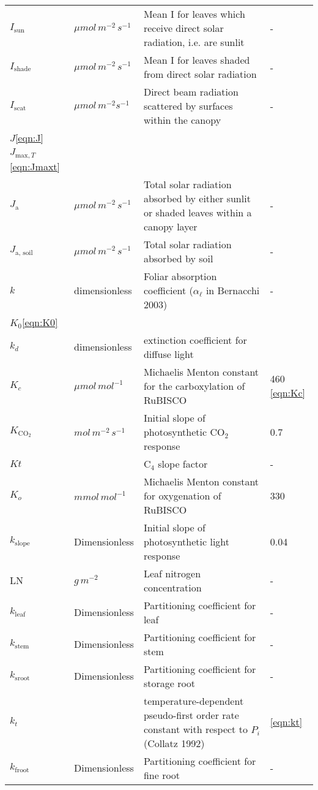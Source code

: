 \documentclass[10pt]{article}
\renewcommand{\marginnote}[2][]{}
\begin{document}
\begin{center}
\begin{longtable}{l l p{3in} p{0.5in}}
$I_\text{sun}$	&	$\mu mol\, m^{-2}\, s^{-1}$ 	&	Mean I for leaves which receive direct solar radiation, i.e. are sunlit	&	-	\\
$I_\text{shade}$	&	$\mu mol\, m^{-2}\, s^{-1}$ 	&	Mean I for leaves shaded from direct solar radiation	&	-	\\
$I_{\text{scat}}$	&	$\mu mol\, m^{-2} s^{-1}$ 	&	Direct beam radiation scattered by surfaces within the canopy	&	-	\\
$J$\ref{eqn:J}\marginnote{undefined}\\
$J_{\text{max},T}$\ref{eqn:Jmaxt}\marginnote{undefined}\\
$J_\text{a}$	&	$\mu mol\, m^{-2}\, s^{-1}$ 	&	Total solar radiation absorbed by either sunlit or shaded leaves within a canopy layer	&	-	\\
$J_\text{a, soil}$	&	$\mu mol\, m^{-2}\, s^{-1}$ 	&	Total solar radiation absorbed by soil	&	-	\\
$k$ &	dimensionless	&	Foliar absorption coefficient ($\alpha_\ell$ in Bernacchi 2003)	&	-	\\
$K_0$\ref{eqn:K0}\marginnote{undefined}\\
$k_d$ & dimensionless & extinction coefficient for diffuse light & \\
$K_c$	&	$\mu mol\, mol^{-1}$ 	&	Michaelis Menton constant for the carboxylation of RuBISCO	&	460	\ref{eqn:Kc}\\
$K_{\text{CO}_2}$  	&	$mol\, m^{-2}\, s^{-1}$ 	&	Initial slope of photosynthetic CO$_2$ response	&	0.7	\\
$Kt$	&		&	C$_4$ slope factor	&	-	\\
$K_{o}$	&	$mmol\, mol^{-1}$	&	Michaelis Menton constant for oxygenation of RuBISCO 	&	330	\\
$k_{\text{slope}}$	&	Dimensionless	&	Initial slope of photosynthetic light response	&	0.04	\\
LN	&	$g\, m^{-2}$ 	&	Leaf nitrogen concentration	&	-	\\
$k_{\text{leaf}}$	&	Dimensionless	&	Partitioning coefficient for leaf	&	-	\\
$k_{\text{stem}}$	&	Dimensionless	&	Partitioning coefficient for stem	&	-	\\
$k_{\text{sroot}}$	&	Dimensionless	&	Partitioning coefficient for storage root	&	-	\\
$k_t$ & & temperature-dependent pseudo-first order rate constant with respect to $P_i$ (Collatz 1992) & \ref{eqn:kt}\\
$k_{\text{froot}}$	&	Dimensionless	&	Partitioning coefficient for fine root	&	-	\\

\end{longtable}
\end{center}
\end{document}
